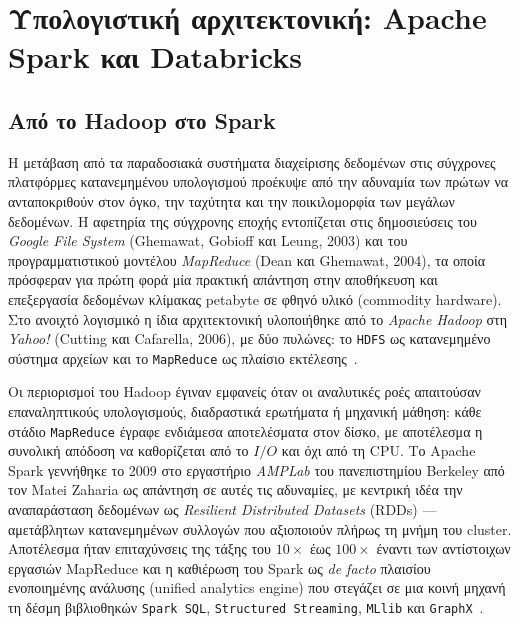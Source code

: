 \documentclass[12pt]{article}
\begin{document}
\newpage

\section{Υπολογιστική αρχιτεκτονική: Apache Spark και Databricks}

\subsection{Από το Hadoop στο Spark}
Η μετάβαση από τα παραδοσιακά συστήματα διαχείρισης δεδομένων στις σύγχρονες πλατφόρμες κατανεμημένου υπολογισμού προέκυψε από την αδυναμία των πρώτων να ανταποκριθούν στον όγκο, την ταχύτητα και την ποικιλομορφία των μεγάλων δεδομένων. Η αφετηρία της σύγχρονης εποχής εντοπίζεται στις δημοσιεύσεις του \emph{Google File System} (Ghemawat, Gobioff και Leung, 2003) και του προγραμματιστικού μοντέλου \emph{MapReduce} (Dean και Ghemawat, 2004), τα οποία πρόσφεραν για πρώτη φορά μία πρακτική απάντηση στην αποθήκευση και επεξεργασία δεδομένων κλίμακας petabyte σε φθηνό υλικό (commodity hardware). Στο ανοιχτό λογισμικό η ίδια αρχιτεκτονική υλοποιήθηκε από το \emph{Apache Hadoop} στη \emph{Yahoo!} (Cutting και Cafarella, 2006), με δύο πυλώνες: το \texttt{HDFS} ως κατανεμημένο σύστημα αρχείων και το \texttt{MapReduce} ως πλαίσιο εκτέλεσης~\cite{Damji2020}.

Οι περιορισμοί του Hadoop έγιναν εμφανείς όταν οι αναλυτικές ροές απαιτούσαν επαναληπτικούς υπολογισμούς, διαδραστικά ερωτήματα ή μηχανική μάθηση: κάθε στάδιο \texttt{MapReduce} έγραφε ενδιάμεσα αποτελέσματα στον δίσκο, με αποτέλεσμα η συνολική απόδοση να καθορίζεται από το $I/O$ και όχι από τη CPU. Το Apache Spark γεννήθηκε το 2009 στο εργαστήριο \emph{AMPLab} του πανεπιστημίου Berkeley από τον Matei Zaharia ως απάντηση σε αυτές τις αδυναμίες, με κεντρική ιδέα την αναπαράσταση δεδομένων ως \emph{Resilient Distributed Datasets} (RDDs) — αμετάβλητων κατανεμημένων συλλογών που αξιοποιούν πλήρως τη μνήμη του cluster. Αποτέλεσμα ήταν επιταχύνσεις της τάξης του $10\times$ έως $100\times$ έναντι των αντίστοιχων εργασιών MapReduce και η καθιέρωση του Spark ως \emph{de facto} πλαισίου ενοποιημένης ανάλυσης (unified analytics engine) που στεγάζει σε μια κοινή μηχανή τη δέσμη βιβλιοθηκών \texttt{Spark SQL}, \texttt{Structured Streaming}, \texttt{MLlib} και \texttt{GraphX}~\cite{Damji2020}.
\end{document}
